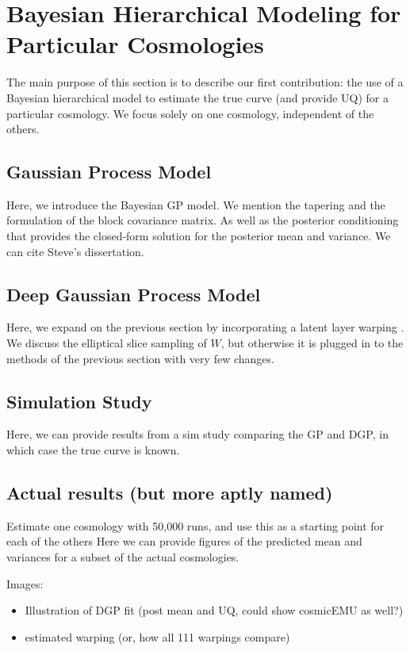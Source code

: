 \documentclass[11pt]{article}
\begin{document}
\section{Bayesian Hierarchical Modeling for Particular Cosmologies}

The main purpose of this section is to describe our first contribution: the use of a Bayesian hierarchical model to estimate the true curve (and provide UQ) for a particular cosmology.  We focus solely on one cosmology, independent of the others.

\subsection{Gaussian Process Model}

Here, we introduce the Bayesian GP model.  We mention the tapering and the formulation of the block covariance matrix.  As well as the posterior conditioning that provides the closed-form solution for the posterior mean and variance.  We can cite Steve's dissertation.

\subsection{Deep Gaussian Process Model}

Here, we expand on the previous section by incorporating a latent layer warping \citep{damianou2013deep}.  We discuss the elliptical slice sampling of $W$, but otherwise it is plugged in to the methods of the previous section with very few changes.

\subsection{Simulation Study}

Here, we can provide results from a sim study comparing the GP and DGP, in which case the true curve is known.

\subsection{Actual results (but more aptly named)}

Estimate one cosmology with 50,000 runs, and use this as a starting point for each of the others
Here we can provide figures of the predicted mean and variances for a subset of the actual cosmologies.

Images:
\begin{itemize}
    \item Illustration of DGP fit (post mean and UQ, could show cosmicEMU as well?)
    \item estimated warping (or, how all 111 warpings compare)
\end{itemize}
\end{document}
